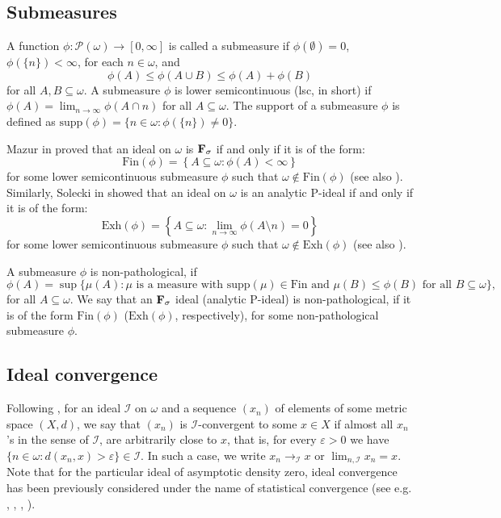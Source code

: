 \documentclass[10pt,a4paper]{amsart}
\newcommand{\I}{\mathcal{I}}
\newcommand{\Fin}{\mathrm{Fin}}
\newcommand{\Exh}{\mathrm{Exh}}
\newcommand{\supp}{\mathrm{supp}}
\begin{document}
\subsection{Submeasures}

A function $\phi:\mathcal{P}(\omega)\to[0,\infty]$ is called a submeasure if $\phi(\emptyset)=0$, $\phi(\{n\})<\infty$, for each $n\in\omega$, and 
$$\phi(A)\leq\phi(A\cup B)\leq\phi(A)+\phi(B)$$
for all $A,B\subseteq\omega$. A submeasure $\phi$ is lower semicontinuous (lsc, in short) if $\phi(A)=\lim_{n\to\infty}\phi(A\cap n)$ for all $A\subseteq\omega$. The support of a submeasure $\phi$ is defined as $\supp(\phi)=\{n\in\omega: \phi(\{n\})\neq 0\}$.

Mazur in \cite[Lemma 1.2]{Mazur} proved that an ideal on $\omega$ is $\bf{F_\sigma}$ if and only if it is of the form:
$$\Fin(\phi)=\left\{A\subseteq\omega: \phi(A)<\infty\right\}$$
for some lower semicontinuous submeasure $\phi$ such that $\omega\notin\Fin(\phi)$ (see also \cite[Theorem 1.2.5]{Farah}). Similarly, Solecki in \cite[Theorem 3.1]{SoleckiExh} showed that an ideal on $\omega$ is an analytic P-ideal if and only if it is of the form:
$$\Exh(\phi)=\left\{A\subseteq\omega: \lim_{n\to\infty}\phi(A\setminus n)=0\right\}$$
for some lower semicontinuous submeasure $\phi$ such that $\omega\notin\Exh(\phi)$ (see also \cite[Theorem 1.2.5]{Farah}). 

A submeasure $\phi$ is non-pathological, if
$$\phi(A)=\sup\{\mu(A): \mu\text{ is a measure with }\supp(\mu)\in\Fin\text{ and }\mu(B)\leq\phi(B)\text{ for all }B\subseteq\omega\},$$
for all $A\subseteq\omega$. We say that an $\bf{F_\sigma}$ ideal (analytic P-ideal) is non-pathological, if it is of the form $\Fin(\phi)$ ($\Exh(\phi)$, respectively), for some non-pathological submeasure $\phi$.

\subsection{Ideal convergence}

Following \cite{KSW}, for an ideal $\I$ on $\omega$ and a sequence $(x_n)$ of elements of some metric space $(X,d)$, we say that $(x_n)$ is $\I$-convergent to some $x\in X$ if almost all $x_n$'s in the sense of $\I$, are arbitrarily close to $x$, that is, for every $\varepsilon>0$ we have $\{n \in \omega: d(x_n , x)> \varepsilon \} \in \I$. In such a case, we write $x_n \to_\I x$ or $\lim_{n,\I}x_n=x$. Note that for the particular ideal of asymptotic density zero, ideal convergence has been previously considered under the name of statistical convergence (see e.g. \cite{Fast}, \cite{Fridy}, \cite{Salat}, \cite{Steinhaus}).
\end{document}

